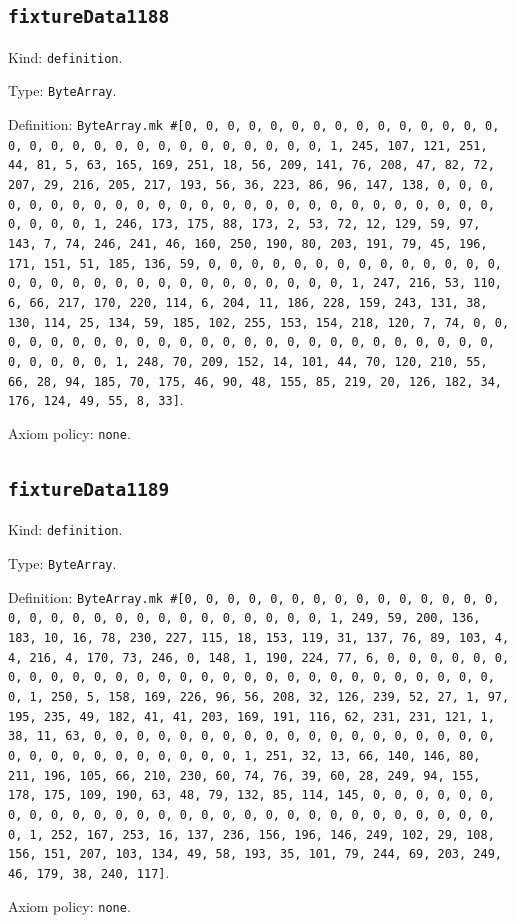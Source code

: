 \documentclass[11pt]{article}
\begin{document}
\subsection*{\texttt{fixtureData1188}}
\noindent Kind: \texttt{definition}.\par
\noindent Type: \texttt{ByteArray}.\par
\noindent Definition: \texttt{ByteArray.mk \#[0, 0, 0, 0, 0, 0, 0, 0, 0, 0, 0, 0, 0, 0, 0, 0, 0, 0, 0, 0, 0, 0, 0, 0, 0, 0, 0, 0, 0, 0, 1, 245, 107, 121, 251, 44, 81, 5, 63, 165, 169, 251, 18, 56, 209, 141, 76, 208, 47, 82, 72, 207, 29, 216, 205, 217, 193, 56, 36, 223, 86, 96, 147, 138, 0, 0, 0, 0, 0, 0, 0, 0, 0, 0, 0, 0, 0, 0, 0, 0, 0, 0, 0, 0, 0, 0, 0, 0, 0, 0, 0, 0, 0, 0, 1, 246, 173, 175, 88, 173, 2, 53, 72, 12, 129, 59, 97, 143, 7, 74, 246, 241, 46, 160, 250, 190, 80, 203, 191, 79, 45, 196, 171, 151, 51, 185, 136, 59, 0, 0, 0, 0, 0, 0, 0, 0, 0, 0, 0, 0, 0, 0, 0, 0, 0, 0, 0, 0, 0, 0, 0, 0, 0, 0, 0, 0, 0, 0, 1, 247, 216, 53, 110, 6, 66, 217, 170, 220, 114, 6, 204, 11, 186, 228, 159, 243, 131, 38, 130, 114, 25, 134, 59, 185, 102, 255, 153, 154, 218, 120, 7, 74, 0, 0, 0, 0, 0, 0, 0, 0, 0, 0, 0, 0, 0, 0, 0, 0, 0, 0, 0, 0, 0, 0, 0, 0, 0, 0, 0, 0, 0, 0, 1, 248, 70, 209, 152, 14, 101, 44, 70, 120, 210, 55, 66, 28, 94, 185, 70, 175, 46, 90, 48, 155, 85, 219, 20, 126, 182, 34, 176, 124, 49, 55, 8, 33]}.\par
\noindent Axiom policy: \texttt{none}.\par
\subsection*{\texttt{fixtureData1189}}
\noindent Kind: \texttt{definition}.\par
\noindent Type: \texttt{ByteArray}.\par
\noindent Definition: \texttt{ByteArray.mk \#[0, 0, 0, 0, 0, 0, 0, 0, 0, 0, 0, 0, 0, 0, 0, 0, 0, 0, 0, 0, 0, 0, 0, 0, 0, 0, 0, 0, 0, 0, 1, 249, 59, 200, 136, 183, 10, 16, 78, 230, 227, 115, 18, 153, 119, 31, 137, 76, 89, 103, 4, 4, 216, 4, 170, 73, 246, 0, 148, 1, 190, 224, 77, 6, 0, 0, 0, 0, 0, 0, 0, 0, 0, 0, 0, 0, 0, 0, 0, 0, 0, 0, 0, 0, 0, 0, 0, 0, 0, 0, 0, 0, 0, 0, 1, 250, 5, 158, 169, 226, 96, 56, 208, 32, 126, 239, 52, 27, 1, 97, 195, 235, 49, 182, 41, 41, 203, 169, 191, 116, 62, 231, 231, 121, 1, 38, 11, 63, 0, 0, 0, 0, 0, 0, 0, 0, 0, 0, 0, 0, 0, 0, 0, 0, 0, 0, 0, 0, 0, 0, 0, 0, 0, 0, 0, 0, 0, 0, 1, 251, 32, 13, 66, 140, 146, 80, 211, 196, 105, 66, 210, 230, 60, 74, 76, 39, 60, 28, 249, 94, 155, 178, 175, 109, 190, 63, 48, 79, 132, 85, 114, 145, 0, 0, 0, 0, 0, 0, 0, 0, 0, 0, 0, 0, 0, 0, 0, 0, 0, 0, 0, 0, 0, 0, 0, 0, 0, 0, 0, 0, 0, 0, 1, 252, 167, 253, 16, 137, 236, 156, 196, 146, 249, 102, 29, 108, 156, 151, 207, 103, 134, 49, 58, 193, 35, 101, 79, 244, 69, 203, 249, 46, 179, 38, 240, 117]}.\par
\noindent Axiom policy: \texttt{none}.\par
\end{document}
